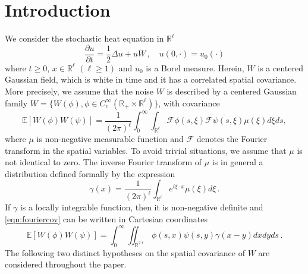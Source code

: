 \documentclass[12pt,reqno]{amsart}
\theoremstyle{remark}
\let\Section=\section
\def\section{\setcounter{equation}{0}\Section}
\newcommand{\1}{\mathbf{1}}
\def\RR{\mathbb{R}}
\def\EE{\mathbb{E}}
\def\cff{{\mathcal F}}
\begin{document}
\section{Introduction} %
\label{sec:introduction}
	We consider the stochastic heat equation in $\RR^\ell$
	\begin{equation}\label{eqn:SHE}
		 \frac {\partial u}{\partial t} =\frac12\Delta u+u \dot{W}\, ,\quad u(0,\cdot)=u_0(\cdot)
	\end{equation}
	where  $t\ge 0$, $x\in \RR^\ell$ $(\ell\ge1)$ and $u_0$ is a Borel measure. Herein, $W$ is  a centered Gaussian field, which is white in time and it has a correlated spatial covariance. More precisely, we assume that the noise $W$ is described by a centered  Gaussian family  $W=\{ W(\phi), \phi \in C_c^\infty(\RR_+\times\RR^\ell)\}$, with covariance
	\begin{equation}\label{eqn:fouriercov}
		\EE [W(\phi)W(\psi)]=\frac1{(2 \pi)^\ell} \int_0^\infty\int_{\RR^\ell} \cff\phi(s,\xi)\overline{\cff\psi(s,\xi)}\mu(\xi) d \xi ds,
	\end{equation}
	where $\mu$ is non-negative measurable function and $\cff$ denotes the Fourier transform in the spatial variables. To avoid trivial situations, we assume that $\mu$ is not identical to zero. The inverse Fourier transform of $\mu$ is in general a distribution defined formally by the expression
	\begin{equation}\label{eqn:gamspec}
		\gamma(x)=\frac1{(2 \pi)^\ell}\int_{\RR^\ell} e^{i \xi  \cdot x}\mu(\xi)d \xi\,.
	\end{equation}
	If $\gamma$ is a locally integrable function, then it is non-negative definite and \eqref{eqn:fouriercov} can be written in Cartesian coordinates
	\begin{equation}\label{eqn:cov}
		\EE [W(\phi)W(\psi)]=\int_0^\infty\iint_{\RR^{2\ell}} \phi(s,x)\psi(s,y)\gamma(x-y)dxdyds\,.
	\end{equation}
	The following two distinct hypotheses on the spatial covariance of $W$ are considered throughout the paper.
\end{document}
